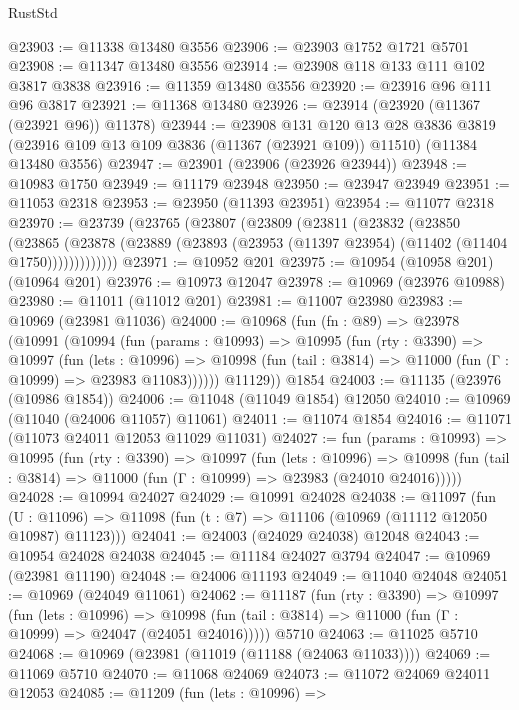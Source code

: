 \begin{lexlean}{RustStd}
\begin{coremodule}
@23903 := @11338 @13480 @3556
@23906 := @23903 @1752 @1721 @5701
@23908 := @11347 @13480 @3556
@23914 := @23908 @118 @133 @111 @102 @3817 @3838
@23916 := @11359 @13480 @3556
@23920 := @23916 @96 @111 @96 @3817
@23921 := @11368 @13480
@23926 := @23914 (@23920 (@11367 (@23921 @96)) @11378)
@23944 := @23908
    @131
    @120
    @13
    @28
    @3836
    @3819
    (@23916 @109 @13 @109 @3836 (@11367 (@23921 @109)) @11510)
    (@11384 @13480 @3556)
@23947 := @23901 (@23906 (@23926 @23944))
@23948 := @10983 @1750
@23949 := @11179 @23948
@23950 := @23947 @23949
@23951 := @11053 @2318
@23953 := @23950 (@11393 @23951)
@23954 := @11077 @2318
@23970 := @23739
    (@23765
      (@23807
        (@23809
          (@23811
            (@23832
              (@23850
                (@23865
                  (@23878 (@23889 (@23893 (@23953 (@11397 @23954) (@11402 (@11404 @1750)))))))))))))
@23971 := @10952 @201
@23975 := @10954 (@10958 @201) (@10964 @201)
@23976 := @10973 @12047
@23978 := @10969 (@23976 @10988)
@23980 := @11011 (@11012 @201)
@23981 := @11007 @23980
@23983 := @10969 (@23981 @11036)
@24000 := @10968
    (fun (fn : @89) =>
    @23978
      (@10991
        (@10994
          (fun (params : @10993) =>
          @10995
            (fun (rty : @3390) =>
            @10997
              (fun (lets : @10996) =>
              @10998 (fun (tail : @3814) => @11000 (fun (Γ : @10999) => @23983 @11083))))))
        @11129))
    @1854
@24003 := @11135 (@23976 (@10986 @1854))
@24006 := @11048 (@11049 @1854) @12050
@24010 := @10969 (@11040 (@24006 @11057) @11061)
@24011 := @11074 @1854
@24016 := @11071 (@11073 @24011 @12053 @11029 @11031)
@24027 := fun (params : @10993) =>
  @10995
    (fun (rty : @3390) =>
    @10997
      (fun (lets : @10996) =>
      @10998 (fun (tail : @3814) => @11000 (fun (Γ : @10999) => @23983 (@24010 @24016)))))
@24028 := @10994 @24027
@24029 := @10991 @24028
@24038 := @11097
    (fun (U : @11096) => @11098 (fun (t : @7) => @11106 (@10969 (@11112 @12050 @10987) @11123)))
@24041 := @24003 (@24029 @24038) @12048
@24043 := @10954 @24028 @24038
@24045 := @11184 @24027 @3794
@24047 := @10969 (@23981 @11190)
@24048 := @24006 @11193
@24049 := @11040 @24048
@24051 := @10969 (@24049 @11061)
@24062 := @11187
    (fun (rty : @3390) =>
    @10997
      (fun (lets : @10996) =>
      @10998 (fun (tail : @3814) => @11000 (fun (Γ : @10999) => @24047 (@24051 @24016)))))
    @5710
@24063 := @11025 @5710
@24068 := @10969 (@23981 (@11019 (@11188 (@24063 @11033))))
@24069 := @11069 @5710
@24070 := @11068 @24069
@24073 := @11072 @24069 @24011 @12053
@24085 := @11209
    (fun (lets : @10996) =>

\end{coremodule}
\end{lexlean}
